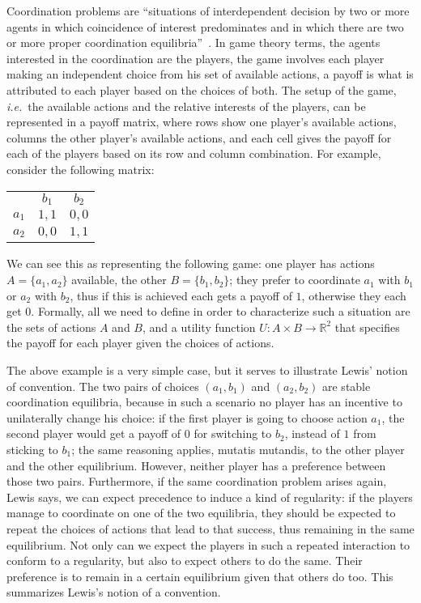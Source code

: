 \documentclass[a4paper]{article}
\begin{document}
Coordination problems are ``situations of interdependent decision by two or more agents in which coincidence of interest predominates and in which there are two or more proper coordination equilibria''~\parencite*[24]{lewis_convention_1969}.
In game theory terms, the agents interested in the coordination are the players, the game involves each player making an independent choice from his set of available actions, a payoff is what is attributed to each player based on the choices of both.
The setup of the game, \emph{i.e.}~the available actions and the relative interests of the players, can be represented in a payoff matrix, where rows show one player's available actions, columns the other player's available actions, and each cell gives the payoff for each of the players based on its row and column combination.
For example, consider the following matrix:
\begin{center}
\begin{tabular}{r|c|c|}
\multicolumn{1}{r}{}
 & \multicolumn{1}{c}{$b_1$}
 & \multicolumn{1}{c}{$b_2$} \\ \cline{2-3}
   $a_1$ & $1,1$ & $0,0$ \\ \cline{2-3}
   $a_2$ & $0,0$ & $1,1$ \\ \cline{2-3}
\end{tabular}
\end{center}
We can see this as representing the following game: one player has actions $A = \lbrace a_1, a_2 \rbrace$ available, the other $B = \lbrace b_1, b_2 \rbrace$; they prefer to coordinate $a_1$ with $b_1$ or $a_2$ with $b_2$, thus if this is achieved each gets a payoff of $1$, otherwise they each get $0$.
Formally, all we need to define in order to characterize such a situation are the sets of actions $A$ and $B$, and a utility function $U : A \times B \rightarrow \mathbb{R}^2$ that specifies the payoff for each player given the choices of actions.

The above example is a very simple case, but it serves to illustrate Lewis' notion of convention.
The two pairs of choices $(a_1,b_1)$ and $(a_2,b_2)$ are stable coordination equilibria, because in such a scenario no player has an incentive to unilaterally change his choice: if the first player is going to choose action $a_1$, the second player would get a payoff of $0$ for switching to $b_2$, instead of $1$ from sticking to $b_1$; the same reasoning applies, mutatis mutandis, to the other player and the other equilibrium.
However, neither player has a preference between those two pairs.
Furthermore, if the same coordination problem arises again, Lewis says, we can expect precedence to induce a kind of regularity: if the players manage to coordinate on one of the two equilibria, they should be expected to repeat the choices of actions that lead to that success, thus remaining in the same equilibrium.
Not only can we expect the players in such a repeated interaction to conform to a regularity, but also to expect others to do the same.
Their preference is to remain in a certain equilibrium given that others do too.
This summarizes Lewis's notion of a convention.
\end{document}
